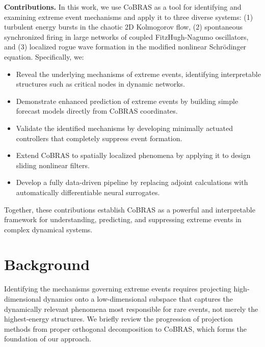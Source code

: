 \documentclass[twocolumn,10pt]{article}
\begin{document}
\smallskip
\noindent\textbf{Contributions.} In this work, we use CoBRAS as a tool for identifying and examining extreme event mechanisms and apply it to three diverse systems: 
(1) turbulent energy bursts in the chaotic 2D Kolmogorov flow, 
(2) spontaneous synchronized firing in large networks of coupled FitzHugh-Nagumo oscillators,
and
(3) localized rogue wave formation in the modified nonlinear Schr{\"o}dinger equation. Specifically, we:

\begin{itemize} %

    \item Reveal the underlying mechanisms of extreme events, identifying interpretable structures such as critical nodes in dynamic networks.
    \item Demonstrate enhanced prediction of extreme events by building simple forecast models directly from CoBRAS coordinates.
    \item Validate the identified mechanisms by developing minimally actuated controllers that completely suppress event formation.
    \item Extend CoBRAS to spatially localized phenomena by applying it to design sliding nonlinear filters.
    \item Develop a fully data-driven pipeline by replacing adjoint calculations with automatically differentiable neural surrogates.
\end{itemize}

Together, these contributions establish CoBRAS as a powerful and interpretable framework for understanding, predicting, and suppressing extreme events in complex dynamical systems.




\section{Background}
\label{sec:background}
Identifying the mechanisms governing extreme events requires projecting high-dimensional dynamics onto a low-dimensional subspace that captures the dynamically relevant phenomena most responsible for rare events, not merely the highest-energy structures. We briefly review the progression of projection methods from proper orthogonal decomposition to CoBRAS, which forms the foundation of our approach.
\end{document}
